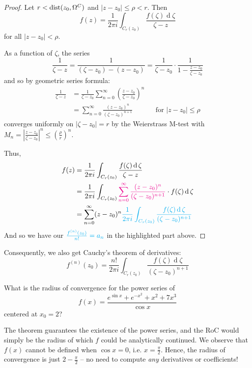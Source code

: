 \documentclass[12pt]{article}
\renewcommand{\d}{\ensuremath{\operatorname{d}}}
\begin{document}
\begin{proof}
    Let $r<\operatorname*{dist}(z_0,\Omega^C)$ and $|z-z_0|\leq \rho<r$. Then \[f(z)=\frac{1}{2\pi i} \int_{{C_r(z_0)}}\frac{f(\zeta)\d \zeta}{\zeta-z}\] for all $|z-z_0|<\rho$. 

    As a function of $\zeta$, the series \[\frac{1}{\zeta-z}=\frac{1}{(\zeta-z_0)-(z-z_0)}=\frac{1}{\zeta-z_0}\cdot \frac{1}{1-\frac{z-z_0}{\zeta-z_0}}\]
    and so by geometric series formula:
    \begin{align*}
        \frac{1}{\zeta-z} &= \frac{1}{\zeta-z_0}\sum_{n=0}^{\infty}\left(\frac{z-z_0}{\zeta-z_0}\right)^n\\
        &= \sum_{n=0}^{\infty}\frac{(z-z_0)^n}{(\zeta-z_0)^{n+1}} &&\text{for } |z-z_0|\leq \rho
    \end{align*}
    converges uniformly on $|\zeta-z_0|=r$ by the Weierstrass M-test with $M_n=\left|\frac{z-z_0}{\zeta-z_0}\right|^n\leq \left(\frac{\rho}{r}\right)^n$.

    Thus, \begin{align*}
        f(z)&=\frac{1}{2\pi i}\int_{{C_r(z_0)}}\frac{f(\zeta)\d \zeta}{\zeta-z}\\
        &= \frac{1}{2\pi i}\int_{{C_r(z_0)}}\rt{\sum_{n=0}^{\infty}\frac{(z-z_0)^n}{(\zeta-z_0)^{n+1}}}\cdot f(\zeta)\d \zeta\\
        &= \sum_{n=0}^{\infty}(z-z_0)^n\bt{
            \frac{1}{2\pi i}\int_{{C_r(z_0)}}\frac{f(\zeta)\d \zeta}{(\zeta-z_0)^{n+1}}
        }
    \end{align*}
    And so we have our $\textcolor{cyan}{\frac{f^{(n)}(z_0)}{n!}=a_n}$ in the highlighted part above. 
\end{proof}

\rmk Consequently, we also get Cauchy's theorem of derivatives: \[f^{(n)}(z_0) = \frac{n!}{2\pi i}\int_{{C_r(z_0)}}\frac{f(\zeta)\d \zeta}{(\zeta-z_0)^{n+1}}\]

\eg What is the radius of convergence for the power series of \[f(x)=\frac{e^{\sin x}+e^{-x^2}+x^2+7x^3}{\cos x}\] centered at $x_0=2$?

The theorem guarantees the existence of the power series, and the RoC would simply be the radius of which $f$ could be analytically continued. We observe that $f(x)$ cannot be defined when $\cos x=0$, i.e. $x=\frac{\pi}{2}$. Hence, the radius of convergence is just $2-\frac{\pi}{2}$ -- no need to compute \textit{any} derivatives or coefficients!

\spl
\end{document}
